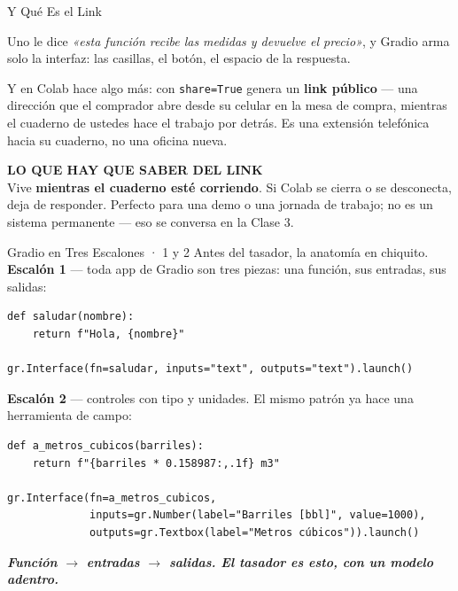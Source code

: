 \documentclass[aspectratio=169, 11pt]{beamer}
\begin{document}
\begin{frame}[shrink=5]{Y Qué Es el Link}
  \vspace{2pt}
  {\footnotesize\color{textMuted}
   Uno le dice \emph{«esta función recibe las medidas y devuelve el precio»},
   y Gradio arma solo la interfaz: las casillas, el botón, el espacio de la
   respuesta.
   \vspace{6pt}

   Y en Colab hace algo más: con \texttt{share=True} genera un \textbf{link
   público} --- una dirección que el comprador abre desde su celular en la
   mesa de compra, mientras el cuaderno de ustedes hace el trabajo por
   detrás. Es una extensión telefónica hacia su cuaderno, no una oficina
   nueva.}
  \vspace{7pt}
  \begin{tcolorbox}[colback=arcaGray, colframe=arcaRed, boxrule=0pt,
    leftrule=3pt, arc=3pt, left=9pt, right=9pt, top=5pt, bottom=5pt]
    {\scriptsize\color{arcaRed}\bfseries LO QUE HAY QUE SABER DEL LINK}\\[3pt]
    {\footnotesize\color{textMuted}
     Vive \textbf{mientras el cuaderno esté corriendo}. Si Colab se cierra o
     se desconecta, deja de responder. Perfecto para una demo o una jornada
     de trabajo; no es un sistema permanente --- eso se conversa en la
     Clase 3.}
  \end{tcolorbox}
\end{frame}

\begin{frame}[fragile, shrink=5]{Gradio en Tres Escalones · 1 y 2}
  \vspace{-2pt}
  {\scriptsize\color{textMuted}
   Antes del tasador, la anatomía en chiquito. \textbf{Escalón 1} --- toda
   app de Gradio son tres piezas: una función, sus entradas, sus salidas:}
  \vspace{2pt}
  \begin{verbatim}
def saludar(nombre):
    return f"Hola, {nombre}"

gr.Interface(fn=saludar, inputs="text", outputs="text").launch()
  \end{verbatim}
  \vspace{3pt}
  {\scriptsize\color{textMuted}
   \textbf{Escalón 2} --- controles con tipo y unidades. El mismo patrón ya
   hace una herramienta de campo:}
  \vspace{2pt}
  \begin{verbatim}
def a_metros_cubicos(barriles):
    return f"{barriles * 0.158987:,.1f} m3"

gr.Interface(fn=a_metros_cubicos,
             inputs=gr.Number(label="Barriles [bbl]", value=1000),
             outputs=gr.Textbox(label="Metros cúbicos")).launch()
  \end{verbatim}
  \vspace{2pt}
  {\scriptsize\color{arcaDark}\bfseries\itshape
   Función $\to$ entradas $\to$ salidas. El tasador es esto, con un modelo
   adentro.}
\end{frame}
\end{document}
